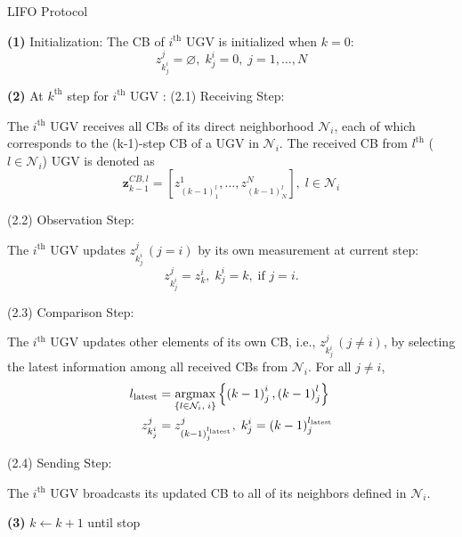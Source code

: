 \documentclass[journal]{IEEEtranTIE}
\theoremstyle{remark}
\newcommand{\argmax}{\operatornamewithlimits{argmax}}
\begin{document}
	\begin{algorithm}
		\caption{LIFO Protocol}
		\label{alg:lifo}
		\begin{algorithmic}
			\State \textbf{(1)} Initialization:
			The CB of $i^\text{th}$ UGV is initialized when $k=0$: 
			\begin{equation*}
				z^j_{k^i_j}=\varnothing,\; k^i_j=0,\;j=1,\dots,N
			\end{equation*}
			
			\State \textbf{(2)} At $k^\text{th}$ step for $i^\text{th}$ UGV :		
			\State (2.1) Receiving Step:
			
			The $i^\text{th}$ UGV receives all CBs of its direct neighborhood $\mathcal{N}_i$, each of which corresponds to the (k-1)-step CB of a UGV in $\mathcal{N}_i$.
			The received CB from $l^\text{th}$ ($l\in \mathcal{N}_i$) UGV is denoted as
			\begin{equation*}
				\mathbf{z}^{CB,l}_{k-1}=\left[ z^1_{(k-1)^l_1},\dots,z^N_{(k-1)^l_N}\right],\; l\in\mathcal{N}_i
			\end{equation*}
			
			\State (2.2) Observation Step: 
			
			The $i^\text{th}$ UGV updates $z^j_{k^i_j}\,(j=i)$ by its own measurement at current step:
			\begin{equation*}
				z^j_{k^i_j}=z^i_k,\;k^i_j=k,\;\text{if }j=i.
			\end{equation*}
			
			\State (2.3) Comparison Step:
			
			The $i^\text{th}$ UGV updates other elements of its own CB, i.e., $z^j_{k^i_j}\,(j\neq i)$, by selecting the latest information among all received CBs from $\mathcal{N}_i$. For all $j\neq i$,
			\small\begin{align*}
				l_\text{latest}&=\argmax_{\left\lbrace l\in \mathcal{N}_i,\;i\right\rbrace}\left\lbrace\left(k-1\right)^i_j,\left(k-1\right)^l_j  \right\rbrace\\
				z^j_{k^i_j}&=z^j_{\left(k-1\right)^{l_\text{latest}}_j},\; k^i_j=\left(k-1\right)^{l_\text{latest}}_j
			\end{align*} \normalsize
			
			\State (2.4) Sending Step:
			
			The $i^\text{th}$ UGV broadcasts its updated CB to all of its neighbors defined in $\mathcal{N}_i$.
			
			\State \textbf{(3)} $k\leftarrow k+1$ until stop
		\end{algorithmic}
	\end{algorithm}
	
\end{document}
